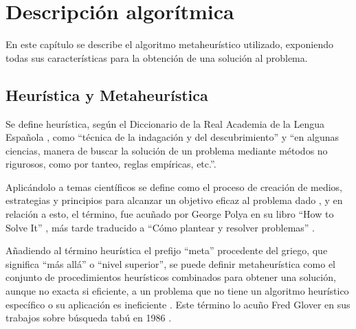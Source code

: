 
\chapter{Descripción algorítmica} %

\label{Chapter3}

En este capítulo se describe el algoritmo metaheurístico utilizado, exponiendo todas sus características para la obtención de una solución al problema.

\section{Heurística y Metaheurística}
Se define heurística, según el Diccionario de la Real Academia de la Lengua Española \cite{rae-heuristica}, como ``técnica de la indagación y del descubrimiento'' y ``en algunas ciencias, manera de buscar la solución de un problema mediante métodos no rigurosos, como por tanteo, reglas empíricas, etc.''.

Aplicándolo a temas científicos se define como el proceso de creación de medios, estrategias y principios para alcanzar un objetivo eficaz al problema dado \cite{conceptodef-heuristica}, y en relación a esto, el término, fue acuñado por George Polya en su libro ``How to Solve It'' \cite{gpolya-book-1}, más tarde traducido a ``Cómo plantear y resolver problemas'' \cite{gpolya-book-2}.

Añadiendo al término heurística el prefijo ``meta'' procedente del griego, que significa ``más allá'' o ``nivel superior'', se puede definir metaheurística como el conjunto de procedimientos heurísticos combinados para obtener una solución, aunque no exacta si eficiente, a un problema que no tiene un algoritmo heurístico específico o su aplicación es ineficiente \cite{wiki-metaheuristica}. Este término lo acuño Fred Glover en sus trabajos sobre búsqueda tabú en 1986 \cite{fred-glover}.

